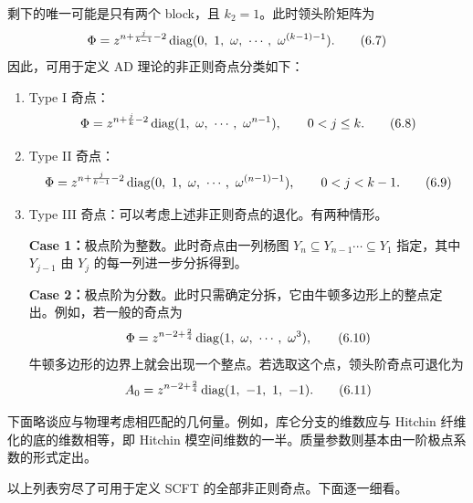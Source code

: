 剩下的唯一可能是只有两个 block，且 $k_2=1$。此时领头阶矩阵为
\begin{equation}
\Phi = z^{n+\frac{j}{k-1}-2}\diag(0,\ 1,\ \omega,\ \cdots,\ \omega^{(k-1)-1}) .
\label{eq:6.7}\tag{6.7}
\end{equation}
因此，可用于定义 AD 理论的非正则奇点分类如下：
\begin{enumerate}
  \item Type I 奇点：
\begin{equation}
\Phi = z^{n+\frac{j}{k}-2}\operatorname{diag}(1,\ \omega,\ \cdots,\ \omega^{n-1}),\qquad 0<j\le k .
\label{eq:6.8}\tag{6.8}
\end{equation}
  \item Type II 奇点：
\begin{equation}
\Phi = z^{n+\frac{j}{k-1}-2}\diag(0,\ 1,\ \omega,\ \cdots,\ \omega^{(n-1)-1}),\qquad 0<j<k-1 .
\label{eq:6.9}\tag{6.9}
\end{equation}
  \item Type III 奇点：可以考虑上述非正则奇点的退化。有两种情形。

  \textbf{Case 1：}极点阶为整数。此时奇点由一列杨图 $Y_n\subseteq Y_{n-1}\cdots\subseteq Y_1$ 指定，其中 $Y_{j-1}$ 由 $Y_j$ 的每一列进一步分拆得到。

  \textbf{Case 2：}极点阶为分数。此时只需确定分拆，它由牛顿多边形上的整点定出。例如，若一般的奇点为
\begin{equation}
\Phi = z^{n-2+\frac{2}{4}}\diag(1,\ \omega,\ \cdots,\ \omega^{3}) ,
\label{eq:6.10}\tag{6.10}
\end{equation}
牛顿多边形的边界上就会出现一个整点。若选取这个点，领头阶奇点可退化为
\begin{equation}
A_0 = z^{n-2+\frac{2}{4}}\diag(1,\ -1,\ 1,\ -1) .
\label{eq:6.11}\tag{6.11}
\end{equation}
\end{enumerate}

下面略谈应与物理考虑相匹配的几何量。例如，库仑分支的维数应与 Hitchin 纤维化的底的维数相等，即 Hitchin 模空间维数的一半。质量参数则基本由一阶极点系数的形式定出。

以上列表穷尽了可用于定义 SCFT 的全部非正则奇点。下面逐一细看。

